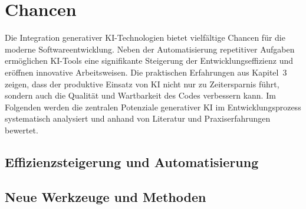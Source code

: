 \chapter{Chancen}
Die Integration generativer KI-Technologien bietet vielfältige Chancen für die
moderne Softwareentwicklung. Neben der Automatisierung repetitiver Aufgaben
ermöglichen KI-Tools eine signifikante Steigerung der Entwicklungseffizienz und
eröffnen innovative Arbeitsweisen. Die praktischen Erfahrungen aus Kapitel~3
zeigen, dass der produktive Einsatz von KI nicht nur zu Zeitersparnis führt,
sondern auch die Qualität und Wartbarkeit des Codes verbessern kann. Im
Folgenden werden die zentralen Potenziale generativer KI im Entwicklungsprozess
systematisch analysiert und anhand von Literatur und Praxiserfahrungen
bewertet.

\section{Effizienzsteigerung und Automatisierung}


\section{Neue Werkzeuge und Methoden}



% 

% 

